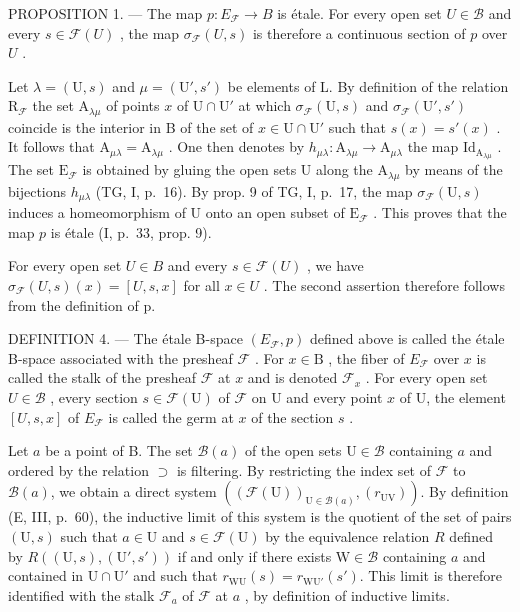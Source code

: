 PROPOSITION 1. --- The map \(p\colon E_{\mathcal{F}} \to B\) is étale. For every open set \(U \in \mathcal{B}\) and every \(s \in \mathcal{F}(U)\) , the map \(\sigma_{\mathcal{F}}(U, s)\) is therefore a continuous section of \(p\) over \(U\) .

Let \(\lambda = (\mathrm{U}, s)\) and \(\mu = (\mathrm{U}', s')\) be elements of L. By definition of the relation \(\mathrm{R}_{\mathcal{F}}\) the set \(\mathrm{A}_{\lambda \mu}\) of points \(x\) of \(\mathrm{U} \cap \mathrm{U}'\) at which \(\sigma_{\mathcal{F}}(\mathrm{U}, s)\) and \(\sigma_{\mathcal{F}}(\mathrm{U}', s')\) coincide is the interior in B of the set of \(x \in \mathrm{U} \cap \mathrm{U}'\) such that \(s(x) = s'(x)\) . It follows that \(\mathrm{A}_{\mu \lambda} = \mathrm{A}_{\lambda \mu}\) . One then denotes by \(h_{\mu \lambda} \colon \mathrm{A}_{\lambda \mu} \to \mathrm{A}_{\mu \lambda}\) the map \(\mathrm{Id}_{\mathrm{A}_{\lambda \mu}}\) . The set \(\mathrm{E}_{\mathcal{F}}\) is obtained by gluing the open sets U along the \(\mathrm{A}_{\lambda \mu}\) by means of the bijections \(h_{\mu \lambda}\) (TG, I, p.~16). By prop. 9 of TG, I, p.~17, the map \(\sigma_{\mathcal{F}}(\mathrm{U},s)\) induces a homeomorphism of U onto an open subset of \(\mathrm{E}_{\mathcal{F}}\) . This proves that the map \(p\) is étale (I, p.~33, prop. 9).

For every open set \(U \in B\) and every \(s \in \mathcal{F}(U)\) , we have \(\sigma_{\mathcal{F}}(U, s)(x) = [U, s, x]\) for all \(x \in U\) . The second assertion therefore follows from the definition of p.

DEFINITION 4. --- The étale B-space \((E_{\mathcal{F}},p)\) defined above is called the étale B-space associated with the presheaf \(\mathcal{F}\) . For \(x \in \mathrm{B}\) , the fiber of \(E_{\mathcal{F}}\) over \(x\) is called the stalk of the presheaf \(\mathcal{F}\) at \(x\) and is denoted \(\mathcal{F}_x\) . For every open set \(U \in \mathcal{B}\) , every section \(s \in \mathcal{F}(\mathrm{U})\) of \(\mathcal{F}\) on U and every point \(x\) of U, the element \([U,s,x]\) of \(E_{\mathcal{F}}\) is called the germ at \(x\) of the section \(s\) .

Let \(a\) be a point of B. The set \(\mathcal{B}(a)\) of the open sets \(\mathrm{U} \in \mathcal{B}\) containing \(a\) and ordered by the relation \(\supset\) is filtering. By restricting the index set of \(\mathcal{F}\) to \(\mathcal{B}(a)\), we obtain a direct system \(((\mathcal{F}(\mathrm{U}))_{\mathrm{U} \in \mathcal{B}(a)}, (r_{\mathrm{UV}}))\). By definition (E, III, p.~60), the inductive limit of this system is the quotient of the set of pairs \((\mathrm{U}, s)\) such that \(a \in \mathrm{U}\) and \(s \in \mathcal{F}(\mathrm{U})\) by the equivalence relation \(R\) defined by \(R((\mathrm{U},s),(\mathrm{U}',s'))\) if and only if there exists \(\mathrm{W} \in \mathcal{B}\) containing \(a\) and contained in \(\mathrm{U} \cap \mathrm{U}'\) and such that \(r_{\mathrm{WU}}(s) = r_{\mathrm{WU}'}(s')\). This limit is therefore identified with the stalk \(\mathcal{F}_a\) of \(\mathcal{F}\) at \(a\) , by definition of inductive limits.

